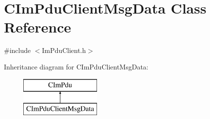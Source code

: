 \hypertarget{class_c_im_pdu_client_msg_data}{}\section{C\+Im\+Pdu\+Client\+Msg\+Data Class Reference}
\label{class_c_im_pdu_client_msg_data}


{\ttfamily \#include $<$Im\+Pdu\+Client.\+h$>$}

Inheritance diagram for C\+Im\+Pdu\+Client\+Msg\+Data\+:\begin{figure}[H]
\begin{center}
\leavevmode
\includegraphics[height=2.000000cm]{class_c_im_pdu_client_msg_data}
\end{center}
\end{figure}
